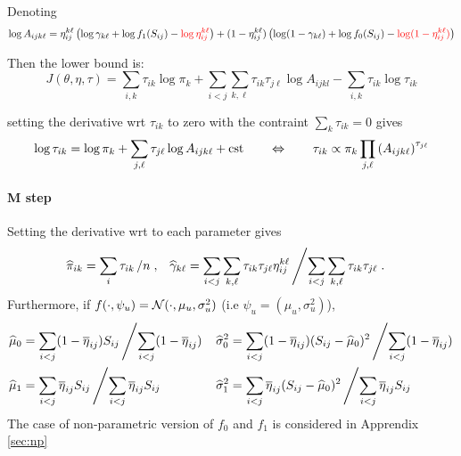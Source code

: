  






\color{black}


Denoting 
$$
\log A_{ijk\ell} = \eta^{k\ell}_{ij} \left(\log \gamma_{k\ell} + \log f_1(S_{ij}) -  \color{red}\log \eta^{k\ell}_{ij} \color{black}\right) + (1 - \eta^{k\ell}_{ij}) \left(\log (1 - \gamma_{k\ell}) + \log f_0(S_{ij})  -  \color{red}\log (1- \eta^{k\ell}_{ij}) \color{black}\right)  
$$

Then the lower bound is: 
$$J(\theta,\eta,\tau) =   \sum_{i, k} \tau_{ik} \log \pi_k  + 
\sum_{i < j} \sum_{k, \ell} \tau_{ik} \tau_{j\ell} \log A_{ijkl} - \sum_{i, k} \tau_{ik} \log \tau_{ik}$$


setting the derivative wrt $\tau_{ik}$ to zero with the contraint $\sum_{k} \tau_{ik} = 0$ gives
$$
\log \tau_{ik} = \log \pi_k + \sum_{j, \ell} \tau_{j\ell} \log A_{ijk\ell} + \text{cst}
\qquad \Leftrightarrow \qquad
\tau_{ik} \propto \pi_k \prod_{j, \ell} \left(A_{ijk\ell}\right)^{\tau_{j\ell}}
$$

\paragraph{M step}
Setting the derivative wrt to each parameter gives
\begin{align*}
 \widehat{\pi}_{ik} & = \sum_{i} \tau_{ik} \left/ n \right.,  
 & \widehat{\gamma}_{k\ell} & = \sum_{i < j} \sum_{k, \ell} \tau_{ik} \tau_{j\ell} \eta^{k\ell}_{ij} \left/ \sum_{i < j} \sum_{k, \ell} \tau_{ik} \tau_{j\ell} \right..
\end{align*}
Furthermore, if $f(\cdot, \psi_u) = \mathcal{N}(\cdot, \mu_u, \sigma_u^2)$ (i.e $\psi_u = (\mu_u, \sigma_u^2)$), 
\begin{align*}
 \widehat{\mu}_0 & = \sum_{i < j} (1 - \overline{\eta}_{ij}) S_{ij} \left/ \sum_{i < j} (1 - \overline{\eta}_{ij}) \right. 
 & \widehat{\sigma}_0^2 & = \sum_{i < j} (1 - \overline{\eta}_{ij}) (S_{ij} - \widehat{\mu}_0)^2 \left/ \sum_{i < j} (1 - \overline{\eta}_{ij}) \right. \\ 
 \widehat{\mu}_1 & = \sum_{i < j} \overline{\eta}_{ij} S_{ij} \left/ \sum_{i < j} \overline{\eta}_{ij} S_{ij} \right. 
 & \widehat{\sigma}_1^2 & = \sum_{i < j} \overline{\eta}_{ij} (S_{ij} - \widehat{\mu}_0)^2 \left/ \sum_{i < j} \overline{\eta}_{ij} S_{ij} \right. \\ 
\end{align*}
The case of non-parametric version of $f_0$ and $f_1$ is considered in Apprendix \ref{sec:np}

